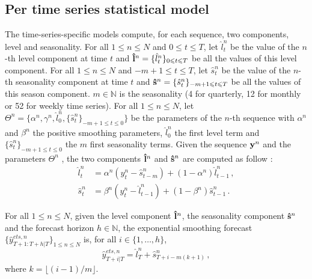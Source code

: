 \documentclass{article} %
\newcommand{\ts}{y}
\newcommand{\fullts}{{\bf \ts}}
\newcommand{\lvl}{\hat{l}}
\newcommand{\fulllvl}{{\bf \lvl}}
\newcommand{\seas}{\hat{s}}
\newcommand{\fullseas}{{\bf \seas}}
\newcommand{\lsmooth}{\alpha}
\newcommand{\ssmooth}{\beta}
\newcommand{\lag}{h}
\newcommand{\etspred}{\hat{y}}
\begin{document}

\subsection{Per time series statistical model}
The time-series-specific models compute, for each sequence, two components,  level  and  seasonality. For all $1\leqslant n \leqslant N$ and $0\leqslant t \leqslant T$, let $\lvl_t^n$ be the value of the $n$-th level component at time $t$ and  $\fulllvl^n = \{\lvl_t^n\}_{0\leqslant t \leqslant T}$ be all the values of this level component. For all $1\leqslant n \leqslant N$ and $-m+1\leqslant t \leqslant T$, let $\seas_t^n$ be the value of the $n$-th seasonality component at time $t$ and  $\fullseas^n = \{\seas_t^n\}_{-m+1\leqslant t \leqslant T}$ be all the values of this season component. $m \in \mathbb{N}$ is the seasonality (4 for quarterly, 12 for monthly or 52 for weekly time series).
For all $1\leqslant n \leqslant N$, let $\Theta^n = \{\alpha^n, \gamma^n, \lvl^n_0, \{\seas_t^n\}_{-m+1\leqslant t \leqslant 0}\}$ be the parameters of the $n$-th sequence with $\lsmooth^n$ and $\ssmooth^n$ the positive smoothing parameters, $\lvl^n_0$ the first level term and $\{\seas_t^n\}_{-m+1\leqslant t \leqslant 0}$ the $m$ first seasonality terms. Given the sequence $\fullts^n$ and the parameters $\Theta^n$ , the two components  $\fulllvl^n$ and $\fullseas^n$ are computed as follow :
\begin{align*}
    \lvl^n_{t} &= \lsmooth^n (\ts^n_t - \seas^n_{t-m}) + (1- \lsmooth^n)\lvl^n_{t-1}\,, \\
    \seas^n_t &= \ssmooth^n (\ts^n_t - \lvl^n_{t-1}) + (1 - \ssmooth^n)\seas^n_{t-1}\,. 
\end{align*}

For all $1\leqslant n \leqslant N$, given the level component $\fulllvl^n$, the seasonality component $\fullseas^n$ and the forecast horizon $\lag \in \mathbb{N}$, the exponential smoothing forecast $\{\etspred^{ets,n}_{T+1:T+\lag|T}\}_{1\leqslant n \leqslant N}$ is, for all $i \in \{1,\ldots,\lag\}$,
$$
\etspred^{ets,n}_{T+i|T} = \lvl^n_T + \seas^n_{T+i-m(k+1)}\,,
$$
where $k = \lfloor(i-1)/m\rfloor$. 
\end{document}
